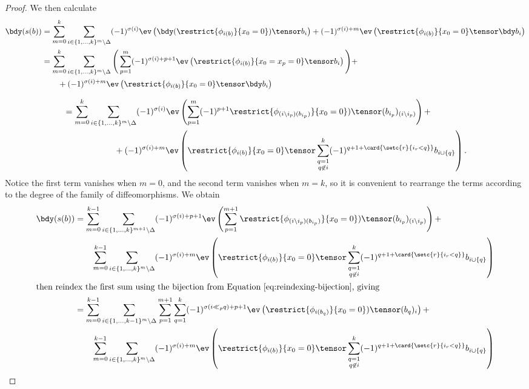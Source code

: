 \begin{proof}
We then calculate
\begin{align*}
\bdy(s(b)) & = \sum_{m=0}^{k} \sum_{i \in \{1, \ldots, k\}^{m} \setminus \Delta} (-1)^{\sigma(i)} \ev\left(\bdy(\restrict{\phi_{i(b)}}{x_0 = 0})\tensor b_i\right) + (-1)^{\sigma(i) + m} \ev\left(\restrict{\phi_{i(b)}}{x_0 = 0} \tensor \bdy b_i\right) \\
	& = \sum_{m=0}^{k} \sum_{i \in \{1, \ldots, k\}^{m} \setminus \Delta} \Bigg(\sum_{p=1}^m (-1)^{\sigma(i)+p+1} \ev\left(\restrict{\phi_{i(b)}}{x_0 = x_p = 0}\tensor b_i\right) \Bigg) + \\
	& \qquad + (-1)^{\sigma(i) + m} \ev\left(\restrict{\phi_{i(b)}}{x_0 = 0} \tensor \bdy b_i\right)
\end{align*}

\begin{align*}
                & = \sum_{m=0}^{k} \sum_{i \in \{1, \ldots, k\}^{m} \setminus \Delta}(-1)^{\sigma(i)} \ev\left(\sum_{p=1}^m (-1)^{p+1} \restrict{\phi_{(i\setminus i_p)(b_{i_p})}}{x_0 = 0})\tensor (b_{i_p})_{(i \setminus i_p)}\right) + \\
                & \qquad \qquad \qquad +  (-1)^{\sigma(i) + m} \ev\left(\restrict{\phi_{i(b)}}{x_0 = 0}\tensor \sum_{\substack{q=1 \\ q \not\in i}}^k (-1)^{q+1+\card{\setc{r}{i_r < q}}} b_{i \cup \{q\}}\right).
\end{align*}
Notice the first term vanishes when $m=0$, and the second term vanishes when $m=k$, so it is convenient to rearrange the terms according to the degree of the family of diffeomorphisms. We obtain
\begin{align*}
\bdy(s(b)) & = \sum_{m=0}^{k-1} \sum_{i \in \{1, \ldots, k\}^{m+1} \setminus \Delta}(-1)^{\sigma(i) + p + 1} \ev\left(\sum_{p=1}^{m+1} \restrict{\phi_{(i\setminus i_p)(b_{i_p})}}{x_0 = 0})\tensor (b_{i_p})_{(i \setminus i_p)}\right) + \\
                & \qquad \sum_{m=0}^{k-1} \sum_{i \in \{1, \ldots, k\}^{m} \setminus \Delta}   (-1)^{\sigma(i) + m} \ev\left(\restrict{\phi_{i(b)}}{x_0 = 0}\tensor \sum_{\substack{q=1 \\ q \not\in i}}^k (-1)^{q+1+\card{\setc{r}{i_r < q}}} b_{i \cup \{q\}}\right) \\
\intertext{then reindex the first sum using the bijection from Equation \eqref{eq:reindexing-bijection}, giving}
               & = \sum_{m=0}^{k-1} \sum_{i \in \{1, \ldots, k-1\}^{m} \setminus \Delta} \sum_{p=1}^{m+1} \sum_{q=1}^k (-1)^{\sigma(i \ll_p q) + p + 1} \ev\left( \restrict{\phi_{i(b_{q})}}{x_0 = 0})\tensor (b_{q})_{i}\right) + \\
                & \qquad \sum_{m=0}^{k-1} \sum_{i \in \{1, \ldots, k\}^{m} \setminus \Delta}   (-1)^{\sigma(i) + m} \ev\left(\restrict{\phi_{i(b)}}{x_0 = 0}\tensor \sum_{\substack{q=1 \\ q \not\in i}}^k (-1)^{q+1+\card{\setc{r}{i_r < q}}} b_{i \cup \{q\}}\right) \\
\end{align*}


\end{proof}
